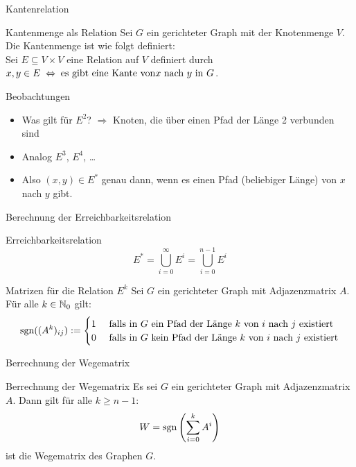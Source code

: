 \begin{frame}{Kantenrelation}
	\begin{block}{Kantenmenge als Relation}
		Sei $G$ ein gerichteter Graph mit der Knotenmenge $V$. Die Kantenmenge ist wie folgt definiert:\\
		Sei $E \subseteq V \times V$ eine Relation auf $V$ definiert durch $x,y \in E \gdw \text{es gibt eine Kante von}x \text{ nach }y \text{ in } G$.
	\end{block}

	\begin{exampleblock}{Beobachtungen}
		\begin{itemize}
			\item Was gilt für $E^2$? \pause $\Rightarrow$ Knoten, die über einen Pfad der Länge 2 verbunden sind
			\item Analog $E^3$, $E^4$, \dots
			\item Also $(x,y) \in E^*$ genau dann, wenn es einen Pfad (beliebiger Länge) von $x$ nach $y$ gibt.
		\end{itemize}
	\end{exampleblock}
\end{frame}

\begin{frame}{Berechnung der Erreichbarkeitsrelation}
    \begin{block}{Erreichbarkeitsrelation}
    	\[
    		E^* = \bigcup_{i=0}^{\infty} E^i = \bigcup_{i=0}^{n-1} E^i
    	\]
    \end{block}

    \begin{block}{Matrizen für die Relation $E^k$}
    	Sei $G$ ein gerichteter Graph mit Adjazenzmatrix $A$. Für alle $k \in \mathbb{N}_0$ gilt:
    	\[
    		\mathop{\text{sgn}}((A^k)_{ij}):=
    		\begin{cases}
      		1 & \text{ falls in $G$ ein Pfad der Länge $k$ von $i$ nach $j$ existiert}\\
      		0 & \text{ falls in $G$ kein Pfad der Länge $k$ von $i$ nach $j$ existiert}\\
    		\end{cases}
    	\]
    \end{block}
\end{frame}

\begin{frame}{Berrechnung der Wegematrix}	
    \begin{block}{Berrechnung der Wegematrix}
    	Es sei $G$ ein gerichteter Graph mit Adjazenzmatrix $A$. Dann gilt für alle $k\geq n-1$: 
    	\[
    		W = \mathop{\text{sgn}}\left(\sum_{i=0}^{k} A^i\right) 
    	\]
    	ist die Wegematrix des Graphen $G$.
    \end{block}
\end{frame}